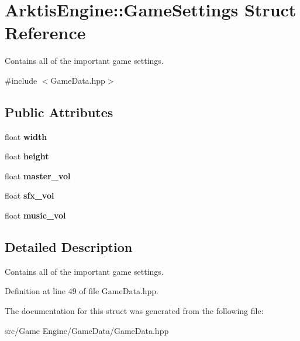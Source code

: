 \hypertarget{struct_arktis_engine_1_1_game_settings}{}\section{Arktis\+Engine\+::Game\+Settings Struct Reference}
\label{struct_arktis_engine_1_1_game_settings}


Contains all of the important game settings.  




{\ttfamily \#include $<$Game\+Data.\+hpp$>$}

\subsection*{Public Attributes}
\begin{DoxyCompactItemize}
\item 
\mbox{\label{struct_arktis_engine_1_1_game_settings_a24ae7ae33228c7fccf82f6604f819983}} 
float {\bfseries width}
\item 
\mbox{\label{struct_arktis_engine_1_1_game_settings_ac608ff03b13b855ab8828d6806a9e4dc}} 
float {\bfseries height}
\item 
\mbox{\label{struct_arktis_engine_1_1_game_settings_a3964f0ff9915f6f0dcc3978c8309cdb7}} 
float {\bfseries master\+\_\+vol}
\item 
\mbox{\label{struct_arktis_engine_1_1_game_settings_a18cbdcf45e9ba31b6a94dfcd4d5a12a3}} 
float {\bfseries sfx\+\_\+vol}
\item 
\mbox{\label{struct_arktis_engine_1_1_game_settings_a358e841c5e19daa5035a6748080e9f0f}} 
float {\bfseries music\+\_\+vol}
\end{DoxyCompactItemize}


\subsection{Detailed Description}
Contains all of the important game settings. 

\begin{DoxyVerb}\end{DoxyVerb}
 

Definition at line 49 of file Game\+Data.\+hpp.



The documentation for this struct was generated from the following file\+:\begin{DoxyCompactItemize}
\item 
src/\+Game Engine/\+Game\+Data/Game\+Data.\+hpp\end{DoxyCompactItemize}
